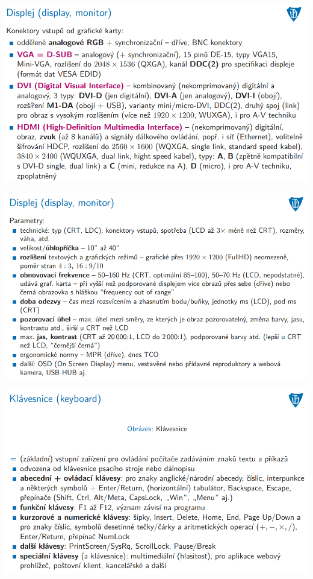 \documentclass[10pt,a4paper]{article}
\begin{document}
\includegraphics[scale=0.65]{img/prvni_odstavec/otazka7/periferie6.png}

\includegraphics[scale=0.65]{img/prvni_odstavec/otazka7/periferie7.png}

\includegraphics[scale=0.65]{img/prvni_odstavec/otazka7/periferie8.png}
\end{document}
